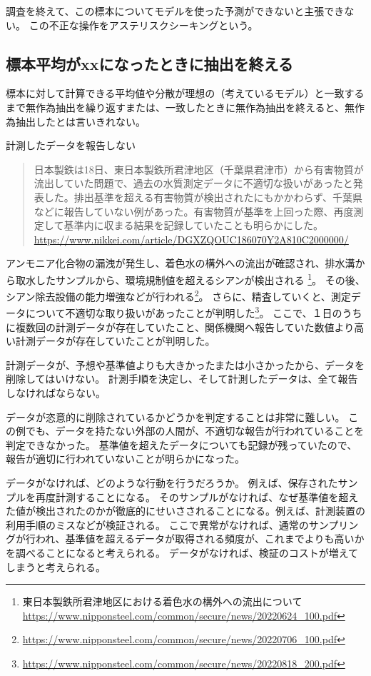 調査を終えて、この標本についてモデルを使った予測ができないと主張できない。
この不正な操作をアステリスクシーキングという。


\subsection{標本平均がxxになったときに抽出を終える}
標本に対して計算できる平均値や分散が理想の（考えているモデル）と一致するまで無作為抽出を繰り返すまたは、一致したときに無作為抽出を終えると、無作為抽出したとは言いきれない。


\begin{SMbox}{計測したデータを報告しない}
    \begin{quote}
        日本製鉄は18日、東日本製鉄所君津地区（千葉県君津市）から有害物質が流出していた問題で、過去の水質測定データに不適切な扱いがあったと発表した。排出基準を超える有害物質が検出されたにもかかわらず、千葉県などに報告していない例があった。有害物質が基準を上回った際、再度測定して基準内に収まる結果を記録していたことも明らかにした。
        \ \ \\ \url{https://www.nikkei.com/article/DGXZQOUC186070Y2A810C2000000/}
    \end{quote}

    アンモニア化合物の漏洩が発生し、着色水の構外への流出が確認され、排水溝から取水したサンプルから、環境規制値を超えるシアンが検出される   \footnote{東日本製鉄所君津地区における着色水の構外への流出について \url{https://www.nipponsteel.com/common/secure/news/20220624_100.pdf}}。
    その後、シアン除去設備の能力増強などが行われる\footnote{\url{https://www.nipponsteel.com/common/secure/news/20220706_100.pdf}}。
    さらに、精査していくと、測定データについて不適切な取り扱いがあったことが判明した\footnote{\url{https://www.nipponsteel.com/common/secure/news/20220818_200.pdf}}。
    ここで、１日のうちに複数回の計測データが存在していたこと、関係機関へ報告していた数値より高い計測データが存在していたことが判明した。

    計測データが、予想や基準値よりも大きかったまたは小さかったから、データを削除してはいけない。
    計測手順を決定し、そして計測したデータは、全て報告しなければならない。

    データが恣意的に削除されているかどうかを判定することは非常に難しい。
    この例でも、データを持たない外部の人間が、不適切な報告が行われていることを判定できなかった。
    基準値を超えたデータについても記録が残っていたので、報告が適切に行われていないことが明らかになった。


    データがなければ、どのような行動を行うだろうか。
    例えば、保存されたサンプルを再度計測することになる。
    そのサンプルがなければ、なぜ基準値を超えた値が検出されたのかが徹底的にせいさされることになる。例えば、計測装置の利用手順のミスなどが検証される。
    ここで異常がなければ、通常のサンプリングが行われ、基準値を超えるデータが取得される頻度が、これまでよりも高いかを調べることになると考えられる。
    データがなければ、検証のコストが増えてしまうと考えられる。

    

\end{SMbox}